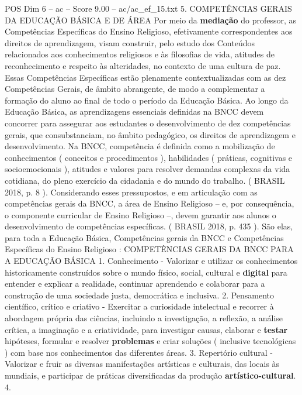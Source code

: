 \begin{textsample}{POS Dim 6 – ac – Score 9.00 – ac/ac\_ef\_15.txt}  \label{ex:f6_pos_155}
5.
COMPETÊNCIAS GERAIS DA EDUCAÇÃO BÁSICA E DE ÁREA Por meio da \textbf{mediação} do professor, as Competências Específicas do Ensino Religioso, efetivamente correspondentes aos direitos de aprendizagem, visam construir, pelo estudo dos Conteúdos relacionados aos conhecimentos religiosos e às filosofias de vida, atitudes de reconhecimento e respeito às alteridades, no contexto de uma cultura de paz.
Essas Competências Específicas estão plenamente contextualizadas com as dez Competências Gerais, de âmbito abrangente, de modo a complementar a formação do aluno ao final de todo o período da Educação Básica.
Ao longo da Educação Básica, as aprendizagens essenciais definidas na BNCC devem concorrer para assegurar aos estudantes o desenvolvimento de dez competências gerais, que consubstanciam, no âmbito pedagógico, os direitos de aprendizagem e desenvolvimento.
Na BNCC, competência é definida como a mobilização de conhecimentos ( conceitos e procedimentos ), habilidades ( práticas, cognitivas e socioemocionais ), atitudes e valores para resolver demandas complexas da vida cotidiana, do pleno exercício da cidadania e do mundo do trabalho. ( BRASIL 2018, p. 8 ).
Considerando esses pressupostos, e em articulação com as competências gerais da BNCC, a área de Ensino Religioso – e, por consequência, o componente curricular de Ensino Religioso –, devem garantir aos alunos o desenvolvimento de competências específicas. ( BRASIL 2018, p. 435 ).
São elas, para toda a Educação Básica, Competências gerais da BNCC e Competências Específicas do Ensino Religioso : COMPETÊNCIAS GERAIS DA BNCC PARA A EDUCAÇÃO BÁSICA 1.
Conhecimento - Valorizar e utilizar os conhecimentos historicamente construídos sobre o mundo físico, social, cultural e \textbf{digital} para entender e explicar a realidade, continuar aprendendo e colaborar para a construção de uma sociedade justa, democrática e inclusiva. 2.
Pensamento científico, crítico e criativo - Exercitar a curiosidade intelectual e recorrer à abordagem própria das ciências, incluindo a investigação, a reflexão, a análise crítica, a imaginação e a criatividade, para investigar causas, elaborar e \textbf{testar} hipóteses, formular e resolver \textbf{problemas} e criar soluções ( inclusive tecnológicas ) com base nos conhecimentos das diferentes áreas. 3.
Repertório cultural - Valorizar e fruir as diversas manifestações artísticas e culturais, das locais às mundiais, e participar de práticas diversificadas da produção \textbf{artístico-cultural}. 4.

\end{textsample}
